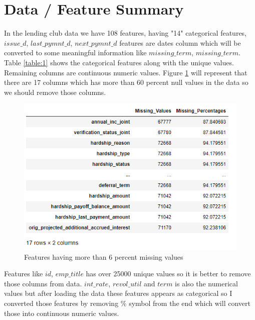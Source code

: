 \documentclass[12pt]{article}
\begin{document}
\section{Data / Feature Summary} 
In the lending club data we have 108 features, having "14" categorical features,  $issue\_d$, $last\_pymnt\_d$, $next\_pymnt\_d$ features are dates column which will be converted to some meaningful information like $missing\_term$, $missing\_term$.
Table \ref{table:1} shows the categorical features along with the unique values. Remaining columns are continuous numeric values. Figure \ref{fig:MissingValues} will represent that there are 17 columns which has more than 60 percent null values in the data so we should remove those columns.
\begin{figure}[h!]
	\centering
	\includegraphics{MissingValues.png}
	\caption{Features having more than 6 percent missing values}
	\label{fig:MissingValues}
\end{figure}
Features like $id$, $emp\_title$ has over 25000 unique values so it is better to remove those columns from data. $int\_rate$, $revol\_util$ and $term$ is also the numerical values but after loading the data these features appears as categorical so I converted those features by removing $\%$ symbol from the end which will convert those into continuous numeric values. 
\end{document}
